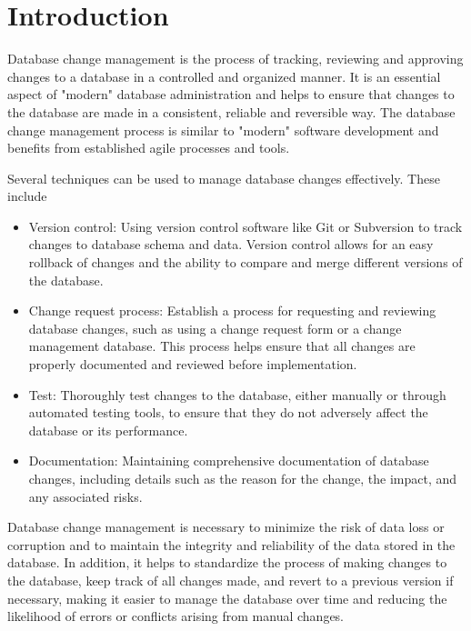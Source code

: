 


\chapter{Introduction}
%
Database change management is the process of tracking, reviewing and approving changes to a database in a controlled and organized manner. It is an essential aspect of "modern" database administration and helps to ensure that changes to the database are made in a consistent, reliable and reversible way. The database change management process is similar to "modern" software development and benefits from established agile processes and tools.

Several techniques can be used to manage database changes effectively. These include

\begin{itemize}
	\item Version control: Using version control software like Git or Subversion to track changes to database schema and data. Version control allows for an easy rollback of changes and the ability to compare and merge different versions of the database.
	
	\item Change request process: Establish a process for requesting and reviewing database changes, such as using a change request form or a change management database. This process helps ensure that all changes are properly documented and reviewed before implementation.
	
	\item Test: Thoroughly test changes to the database, either manually or through automated testing tools, to ensure that they do not adversely affect the database or its performance.
	
	\item Documentation: Maintaining comprehensive documentation of database changes, including details such as the reason for the change, the impact, and any associated risks.
	
\end{itemize}

Database change management is necessary to minimize the risk of data loss or corruption and to maintain the integrity and reliability of the data stored in the database. In addition, it helps to standardize the process of making changes to the database, keep track of all changes made, and revert to a previous version if necessary, making it easier to manage the database over time and reducing the likelihood of errors or conflicts arising from manual changes.

